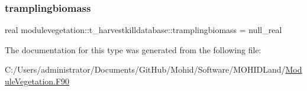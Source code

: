\mbox{\label{structmodulevegetation_1_1t__harvestkilldatabase_a9d1b143bd382f914e16085cb9b2c71a0}} 
\subsubsection{\texorpdfstring{tramplingbiomass}{tramplingbiomass}}
{\footnotesize\ttfamily real modulevegetation\+::t\+\_\+harvestkilldatabase\+::tramplingbiomass = null\+\_\+real\hspace{0.3cm}{\ttfamily [private]}}



The documentation for this type was generated from the following file\+:\begin{DoxyCompactItemize}
\item 
C\+:/\+Users/administrator/\+Documents/\+Git\+Hub/\+Mohid/\+Software/\+M\+O\+H\+I\+D\+Land/\mbox{\hyperlink{_module_vegetation_8_f90}{Module\+Vegetation.\+F90}}\end{DoxyCompactItemize}

